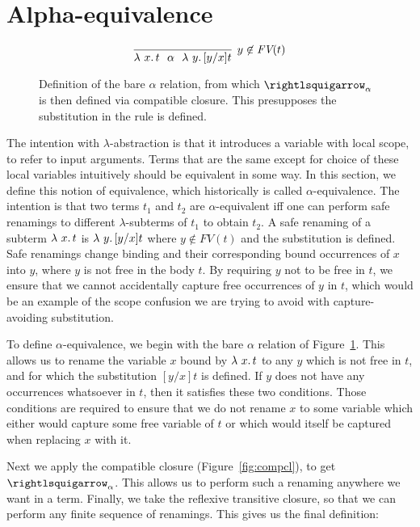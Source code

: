   

\section{Alpha-equivalence}
\label{sec:alpha}

\begin{figure}
  \[
   \infer[y\not\in\textit{FV}(t)]{\lam{x}{t}\ \ \alpha\ \ \lam{y}{[y/x]t}}{\ }
  \]

  \caption{Definition of the bare $\alpha$ relation, from which $\curva_\alpha$ is then defined
    via compatible closure.  This presupposes the substitution in the rule is defined.}
\label{fig:barealpha}
\end{figure}

The intention with $\lambda$-abstraction is that it introduces a
variable with local scope, to refer to input arguments.  Terms that
are the same except for choice of these local variables intuitively
should be equivalent in some way.  In this section, we define this
notion of equivalence, which historically is called
$\alpha$-equivalence.  The intention is
that two terms $t_1$ and $t_2$ are $\alpha$-equivalent iff one can
perform safe renamings to different $\lambda$-subterms of $t_1$ to
obtain $t_2$.  A safe renaming of a subterm $\lambda\ x.\, t$ is
$\lambda\ y.\, [y/x]t$ where $y\not\in\textit{FV}(t)$ and the substitution
is defined.  Safe renamings
change binding and their corresponding bound occurrences of $x$ into
$y$, where $y$ is not free in the body $t$.  By requiring $y$ not to
be free in $t$, we ensure that we cannot accidentally capture free
occurrences of $y$ in $t$, which would be an example of the scope
confusion we are trying to avoid with capture-avoiding substitution.

To define $\alpha$-equivalence, we begin with the bare $\alpha$
relation of Figure~\ref{fig:barealpha}.  This allows us to rename the
variable $x$ bound by $\lambda\ x.\, t$ to any $y$ which is not free in
$t$, and for which the substitution $[y/x] t$ is defined.  If $y$ does
not have any occurrences whatsoever in $t$, then it satisfies these
two conditions.  Those conditions are required to ensure that we do
not rename $x$ to some variable which either would capture some free
variable of $t$ or which would itself be captured when replacing $x$
with it.

Next we apply the compatible closure (Figure~\ref{fig:compcl}), to get
$\curva_\alpha$.  This allows us to perform such a renaming anywhere
we want in a term.  Finally, we take the reflexive transitive closure,
so that we can perform any finite sequence of renamings.  This gives
us the final definition:

